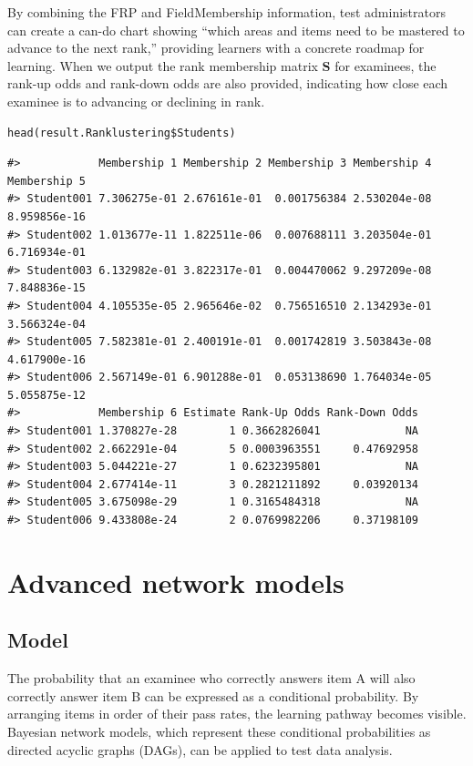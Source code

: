 By combining the FRP and FieldMembership information, test administrators can create a can-do chart showing ``which areas and items need to be mastered to advance to the next rank,'' providing learners with a concrete roadmap for learning. When we output the rank membership matrix \(\mathbf{S}\) for examinees, the rank-up odds and rank-down odds are also provided, indicating how close each examinee is to advancing or declining in rank.

\begin{verbatim}
head(result.Ranklustering$Students)
\end{verbatim}

\begin{verbatim}
#>            Membership 1 Membership 2 Membership 3 Membership 4 Membership 5
#> Student001 7.306275e-01 2.676161e-01  0.001756384 2.530204e-08 8.959856e-16
#> Student002 1.013677e-11 1.822511e-06  0.007688111 3.203504e-01 6.716934e-01
#> Student003 6.132982e-01 3.822317e-01  0.004470062 9.297209e-08 7.848836e-15
#> Student004 4.105535e-05 2.965646e-02  0.756516510 2.134293e-01 3.566324e-04
#> Student005 7.582381e-01 2.400191e-01  0.001742819 3.503843e-08 4.617900e-16
#> Student006 2.567149e-01 6.901288e-01  0.053138690 1.764034e-05 5.055875e-12
#>            Membership 6 Estimate Rank-Up Odds Rank-Down Odds
#> Student001 1.370827e-28        1 0.3662826041             NA
#> Student002 2.662291e-04        5 0.0003963551     0.47692958
#> Student003 5.044221e-27        1 0.6232395801             NA
#> Student004 2.677414e-11        3 0.2821211892     0.03920134
#> Student005 3.675098e-29        1 0.3165484318             NA
#> Student006 9.433808e-24        2 0.0769982206     0.37198109
\end{verbatim}

\section{Advanced network models}\label{advanced-network-models}

\subsection{Model}\label{model-2}

The probability that an examinee who correctly answers item A will also correctly answer item B can be expressed as a conditional probability. By arranging items in order of their pass rates, the learning pathway becomes visible. Bayesian network models, which represent these conditional probabilities as directed acyclic graphs (DAGs), can be applied to test data analysis.

